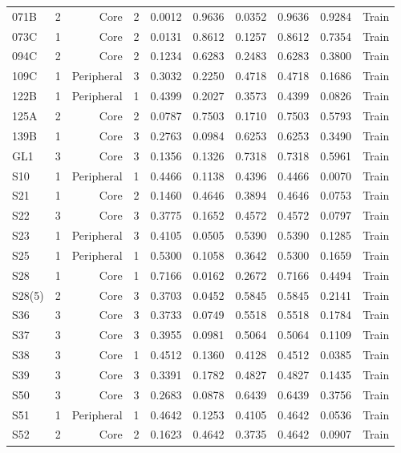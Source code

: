 {\begin{longtable}{lrrrrrrrrr}
  071B & 2 & Core & 2 & 0.0012 & 0.9636 & 0.0352 & 0.9636 & 0.9284 & Train \\
  073C & 1 & Core & 2 & 0.0131 & 0.8612 & 0.1257 & 0.8612 & 0.7354 & Train \\
  094C & 2 & Core & 2 & 0.1234 & 0.6283 & 0.2483 & 0.6283 & 0.3800 & Train \\
  109C & 1 & Peripheral & 3 & 0.3032 & 0.2250 & 0.4718 & 0.4718 & 0.1686 & Train \\
  122B & 1 & Peripheral & 1 & 0.4399 & 0.2027 & 0.3573 & 0.4399 & 0.0826 & Train \\
  125A & 2 & Core & 2 & 0.0787 & 0.7503 & 0.1710 & 0.7503 & 0.5793 & Train \\
  139B & 1 & Core & 3 & 0.2763 & 0.0984 & 0.6253 & 0.6253 & 0.3490 & Train \\
  GL1 & 3 & Core & 3 & 0.1356 & 0.1326 & 0.7318 & 0.7318 & 0.5961 & Train \\
  S10 & 1 & Peripheral & 1 & 0.4466 & 0.1138 & 0.4396 & 0.4466 & 0.0070 & Train \\
  S21 & 1 & Core & 2 & 0.1460 & 0.4646 & 0.3894 & 0.4646 & 0.0753 & Train \\
  S22 & 3 & Core & 3 & 0.3775 & 0.1652 & 0.4572 & 0.4572 & 0.0797 & Train \\
  S23 & 1 & Peripheral & 3 & 0.4105 & 0.0505 & 0.5390 & 0.5390 & 0.1285 & Train \\
  S25 & 1 & Peripheral & 1 & 0.5300 & 0.1058 & 0.3642 & 0.5300 & 0.1659 & Train \\
  S28 & 1 & Core & 1 & 0.7166 & 0.0162 & 0.2672 & 0.7166 & 0.4494 & Train \\
  S28(5) & 2 & Core & 3 & 0.3703 & 0.0452 & 0.5845 & 0.5845 & 0.2141 & Train \\
  S36 & 3 & Core & 3 & 0.3733 & 0.0749 & 0.5518 & 0.5518 & 0.1784 & Train \\
  S37 & 3 & Core & 3 & 0.3955 & 0.0981 & 0.5064 & 0.5064 & 0.1109 & Train \\
  S38 & 3 & Core & 1 & 0.4512 & 0.1360 & 0.4128 & 0.4512 & 0.0385 & Train \\
  S39 & 3 & Core & 3 & 0.3391 & 0.1782 & 0.4827 & 0.4827 & 0.1435 & Train \\
  S50 & 3 & Core & 3 & 0.2683 & 0.0878 & 0.6439 & 0.6439 & 0.3756 & Train \\
  S51 & 1 & Peripheral & 1 & 0.4642 & 0.1253 & 0.4105 & 0.4642 & 0.0536 & Train \\
  S52 & 2 & Core & 2 & 0.1623 & 0.4642 & 0.3735 & 0.4642 & 0.0907 & Train \\

\end{longtable}}
